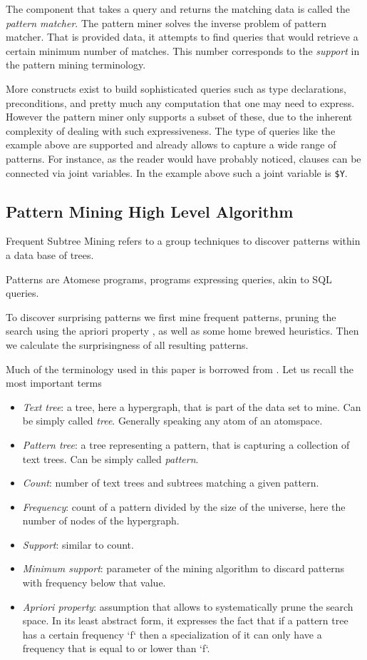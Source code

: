 \documentclass[runningheads]{llncs}
\begin{document}
The component that takes a query and returns the matching data is
called the \emph{pattern matcher}. The pattern miner solves the
inverse problem of pattern matcher. That is provided data, it attempts
to find queries that would retrieve a certain minimum number of
matches. This number corresponds to the \emph{support} in the pattern
mining terminology.

More constructs exist to build sophisticated queries such as type
declarations, preconditions, and pretty much any computation that one
may need to express. However the pattern miner only supports a subset
of these, due to the inherent complexity of dealing with such
expressiveness. The type of queries like the example above are
supported and already allows to capture a wide range of patterns. For
instance, as the reader would have probably noticed, clauses can be
connected via joint variables. In the example above such a joint
variable is \texttt{\$Y}.

\subsection{Pattern Mining High Level Algorithm}

Frequent Subtree Mining \cite{Chi2005Freq} refers to a group
techniques to discover patterns within a data base of trees.

Patterns are Atomese programs, programs expressing queries, akin to
SQL queries.

To discover surprising patterns we first mine frequent patterns,
pruning the search using the apriori property
\cite{Agrawal1994fastalgorithms}, as well as some home brewed
heuristics. Then we calculate the surprisingness of all resulting
patterns.

Much of the terminology used in this paper is borrowed from
. Let us recall the most important terms
\begin{itemize}
\item \emph{Text tree}: a tree, here a hypergraph, that is part of the
  data set to mine. Can be simply called \emph{tree}. Generally
  speaking any atom of an atomspace.
\item \emph{Pattern tree}: a tree representing a pattern, that is
  capturing a collection of text trees. Can be simply called
  \emph{pattern}.
\item \emph{Count}: number of text trees and subtrees matching a
  given pattern.
\item \emph{Frequency}: count of a pattern divided by the size of the
  universe, here the number of nodes of the hypergraph.
\item \emph{Support}: similar to count.
\item \emph{Minimum support}: parameter of the mining algorithm to discard
  patterns with frequency below that value.
\item \emph{Apriori property}: assumption that allows to systematically prune
  the search space. In its least abstract form, it expresses the fact
  that if a pattern tree has a certain frequency `f` then a
  specialization of it can only have a frequency that is equal to or
  lower than `f`.
\end{itemize}
\end{document}
